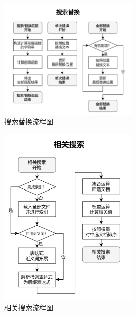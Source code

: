 \documentclass[scheme = chinese]{ctexart}
\begin{document}
\begin{figure}[h]
    \centering
    \includegraphics[width=0.6\textwidth]{images/dsacd-流程图-搜索替换.drawio.png}
    \caption{搜索替换流程图}
\end{figure}

\begin{figure}[h]
    \centering
    \includegraphics[width=0.6\textwidth]{images/dsacd-流程图-相关搜索.drawio.png}
    \caption{相关搜索流程图}
\end{figure}
\end{document}
